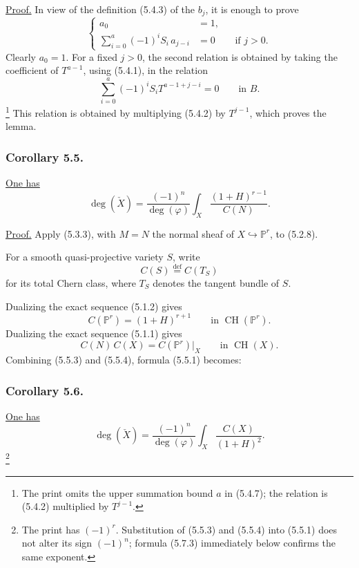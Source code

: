\noindent\underline{Proof.}
In view of the definition (5.4.3) of the $b_j$, it is enough to prove
\begin{equation}\tag{5.4.6}
\left\{
\begin{aligned}
a_0&=1,\\
\sum_{i=0}^{a}(-1)^iS_i\,a_{j-i}&=0
&&\text{if }j>0.
\end{aligned}
\right.
\end{equation}
Clearly $a_0=1$.  For a fixed $j>0$, the second relation is obtained
by taking the coefficient of $T^{a-1}$, using (5.4.1), in the
relation
\begin{equation}\tag{5.4.7}
\sum_{i=0}^{a}(-1)^iS_iT^{a-1+j-i}=0
\qquad\text{in }B.
\end{equation}
\footnote{The print omits the upper summation bound $a$ in (5.4.7);
the relation is (5.4.2) multiplied by $T^{j-1}$.}
This relation is obtained by multiplying (5.4.2) by $T^{j-1}$,
which proves the lemma.

\subsubsection*{Corollary 5.5.}
\underline{One has}
\begin{equation}\tag{5.5.1}
\deg(\check X)
=\frac{(-1)^n}{\deg(\varphi)}
\int_X\frac{(1+H)^{r-1}}{C(N)}.
\end{equation}

\noindent\underline{Proof.}
Apply (5.3.3), with $M=N$ the normal sheaf of
$X\hookrightarrow\mathbb P^r$, to (5.2.8).

For a smooth quasi-projective variety $S$, write
\begin{equation}\tag{5.5.2}
C(S)\stackrel{\mathrm{def}}{=}C(T_S)
\end{equation}
for its total Chern class, where $T_S$ denotes the tangent bundle of
$S$.

Dualizing the exact sequence (5.1.2) gives
\begin{equation}\tag{5.5.3}
C(\mathbb P^r)=(1+H)^{r+1}
\qquad\text{in }\operatorname{CH}(\mathbb P^r).
\end{equation}
Dualizing the exact sequence (5.1.1) gives
\begin{equation}\tag{5.5.4}
C(N)\,C(X)=C(\mathbb P^r)|_X
\qquad\text{in }\operatorname{CH}(X).
\end{equation}
Combining (5.5.3) and (5.5.4), formula (5.5.1) becomes:

\subsubsection*{Corollary 5.6.}
\underline{One has}
\begin{equation}\tag{5.6.1}
\deg(\check X)
=\frac{(-1)^n}{\deg(\varphi)}
\int_X\frac{C(X)}{(1+H)^2}.
\end{equation}
\footnote{The print has $(-1)^r$.  Substitution of (5.5.3) and
(5.5.4) into (5.5.1) does not alter its sign $(-1)^n$; formula
(5.7.3) immediately below confirms the same exponent.}

